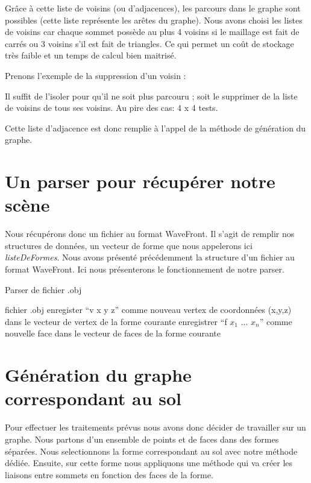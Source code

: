 \documentclass[a4paper,12pt]{report}
\begin{document}
Grâce à cette liste de voisins (ou d'adjacences), les parcours dans le graphe sont possibles (cette liste représente les arêtes du graphe). Nous avons choisi les listes de voisins car chaque sommet possède au plus 4 voisins si le maillage est fait de carrés ou 3 voisins s'il est fait de triangles. Ce qui permet un coût de stockage très faible et un temps de calcul bien maitrisé. 

Prenons l'exemple de la suppression d'un voisin :

Il suffit de l'isoler pour qu'il ne soit plus parcouru ; soit le supprimer de la liste de voisins de tous ses voisins. Au pire des cas: 4 x 4 tests.
 
Cette liste d'adjacence est donc remplie à l'appel de la méthode de génération du graphe.

\section{Un parser pour récupérer notre scène}

Nous récupérons donc un fichier au format WaveFront. Il s'agit de remplir nos structures de données, un vecteur de forme que nous appelerons ici \textit{listeDeFormes}.
Nous avons présenté précédemment la structure d'un fichier au format WaveFront. Ici nous présenterons le fonctionnement de notre parser.

\begin{algorithm}[h]
\caption{Parser de fichier .obj}
\label{parser}
\begin{algorithmic}[1]
\REQUIRE fichier .obj
    \STATE enregister ``v x y z'' comme nouveau vertex de coordonnées (x,y,z) dans le vecteur de vertex de la forme courante
  \ELSE
    \STATE enregistrer ``f $x_{1}$ ... $x_{n}$'' comme nouvelle face dans le vecteur de faces de la forme courante
    \ENDIF
  \ENDIF
\ENDFOR
\end{algorithmic}
\end{algorithm}

\section{Génération du graphe correspondant au sol}

Pour effectuer les traitements prévus nous avons donc décider de travailler sur un graphe. Nous partons d'un ensemble de points et de faces dans des formes séparées. Nous selectionnons la forme correspondant au sol avec notre méthode dédiée. Ensuite, sur cette forme nous appliquons une méthode qui va créer les liaisons entre sommets en fonction des faces de la forme. 
\end{document}
